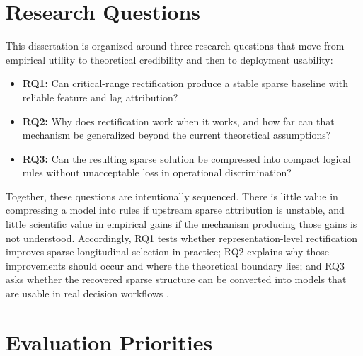 \section{Research Questions}

This dissertation is organized around three research questions that move from empirical utility to theoretical credibility and then to deployment usability:
\begin{itemize}
    \item \textbf{RQ1:} Can critical-range rectification produce a stable sparse baseline with reliable feature and lag attribution?
    \item \textbf{RQ2:} Why does rectification work when it works, and how far can that mechanism be generalized beyond the current theoretical assumptions?
    \item \textbf{RQ3:} Can the resulting sparse solution be compressed into compact logical rules without unacceptable loss in operational discrimination?
\end{itemize}

Together, these questions are intentionally sequenced. There is little value in compressing a model into rules if upstream sparse attribution is unstable, and little scientific value in empirical gains if the mechanism producing those gains is not understood. Accordingly, RQ1 tests whether representation-level rectification improves sparse longitudinal selection in practice; RQ2 explains why those improvements should occur and where the theoretical boundary lies; and RQ3 asks whether the recovered sparse structure can be converted into models that are usable in real decision workflows \autocites{PZhao2006model,freijeirogonzalez2022,CRudin2019Stop,WJMurdoch2019Definitions}.

\section{Evaluation Priorities}

